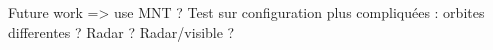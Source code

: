 \documentclass{ipol}
\begin{document}
Future work => use MNT ? Test sur configuration plus compliquées : orbites differentes ? Radar ? Radar/visible ?










%
%
%
\end{document}
